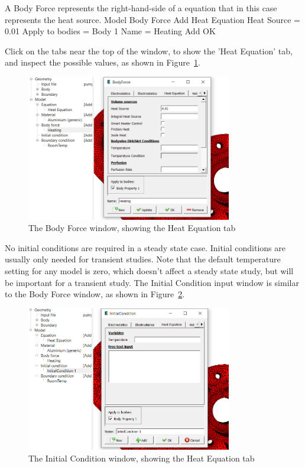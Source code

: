 A Body Force represents the right-hand-side of a equation that in this case represents the heat source. 
\ttbegin
Model
  Body Force
    Add 
      Heat Equation
        Heat Source = 0.01
      Apply to bodies = Body 1
      Name = Heating
      Add
      OK
\ttend

Click on the tabs near the top of the window, to show the 'Heat Equation' tab, and inspect the possible values, as shown in Figure~\ref{fg:step-04}.

\begin{figure}[H]
\begin{center}
\includegraphics[width=0.8\textwidth]{step-04}
\caption{The Body Force window, showing the Heat Equation tab}\label{fg:step-04}
\end{center}
\end{figure}

No initial conditions are required in a steady state case.  Initial conditions are usually only needed for transient studies.  Note that the default temperature setting for any model is zero, which doesn't affect a steady state study, but will be important for a transient study.  The Initial Condition input window is similar to the Body Force window, as shown in Figure~\ref{fg:step-05}.\\

\begin{figure}[H]
\begin{center}
\includegraphics[width=0.8\textwidth]{step-05}
\caption{The Initial Condition window, showing the Heat Equation tab}\label{fg:step-05}
\end{center}
\end{figure}

